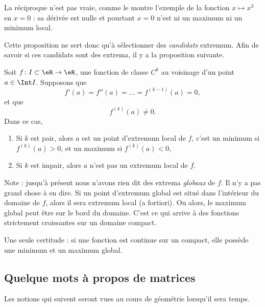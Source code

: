 La réciproque n'est pas vraie, comme le montre l'exemple de la fonction $x\mapsto x^3$ en $x=0$ : sa dérivée est nulle et pourtant $x=0$ n'est ni un maximum ni un minimum local. 

Cette proposition ne sert donc qu'à sélectionner des \emph{candidats} extremum. Afin de savoir si ces candidats sont des extrema, il y a la proposition suivante.
\begin{proposition}
Soit $f\colon I\subset \eR\to \eR$, une fonction de classe $C^k$ au voisinage d'un point $a\in\Int I$. Supposons que
\begin{equation}
    f'(a)=f''(a)=\ldots=f^{(k-1)}(a)=0,
\end{equation}
et que
\begin{equation}
    f^{(k)}(a)\neq 0.
\end{equation}
Dans ce cas,
\begin{enumerate}

\item
Si $k$ est pair, alors $a$ est un point d'extremum local de $f$, c'est un minimum si $f^{(k)}(a)>0$, et un maximum si $f^{(k)}(a)<0$,
\item
Si $k$ est impair, alors $a$ n'est pas un extremum local de $f$.

\end{enumerate}
\end{proposition}

Note : jusqu'à présent nous n'avons rien dit des extrema \emph{globaux} de $f$. Il n'y a pas grand chose à en dire. Si un point d'extremum global est situé dans l'intérieur du domaine de $f$, alors il sera extremum local (a fortiori). Ou alors, le maximum global peut être sur le bord du domaine. C'est ce qui arrive à des fonctions strictement croissantes sur un domaine compact.

Une seule certitude : si une fonction est continue sur un compact, elle possède une minimum et un maximum global.

                    \subsection{Quelque mots à propos de matrices}

Les notions qui suivent seront vues au cours de géométrie lorsqu'il sera temps. 

